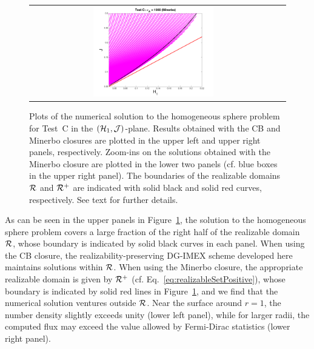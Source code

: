 \begin{figure}[h]
\begin{tabular}{cc}
    \includegraphics[width=0.5\textwidth]{figures/HomogeneousSphere_Realizability_Chi_1e3_Minerbo_Box2}
  \end{tabular}
   \caption{Plots of the numerical solution to the homogeneous sphere problem for Test~C in the $(\mathcal{H}_{1},\mathcal{J})$-plane.  Results obtained with the CB and Minerbo closures are plotted in the upper left and upper right panels, respectively.  Zoom-ins on the solutions obtained with the Minerbo closure are plotted in the lower two panels (cf. blue boxes in the upper right panel).  The boundaries of the realizable domains $\mathcal{R}$ and $\mathcal{R}^{+}$ are indicated with solid black and solid red curves, respectively.  See text for further details.  }
  \label{fig:HomogeneousSphereRealizability}
\end{figure}
As can be seen in the upper panels in Figure~\ref{fig:HomogeneousSphereRealizability}, the solution to the homogeneous sphere problem covers a large fraction of the right half of the realizable domain $\mathcal{R}$, whose boundary is indicated by solid black curves in each panel.  
When using the CB closure, the realizability-preserving DG-IMEX scheme developed here maintains solutions within $\mathcal{R}$.  
When using the Minerbo closure, the appropriate realizable domain is given by $\mathcal{R}^{+}$ (cf. Eq.~\eqref{eq:realizableSetPositive}), whose boundary is indicated by solid red lines in Figure~\ref{fig:HomogeneousSphereRealizability}, and we find that the numerical solution ventures outside $\mathcal{R}$.  
Near the surface around $r=1$, the number density slightly exceeds unity (lower left panel), while for larger radii, the computed flux may exceed the value allowed by Fermi-Dirac statistics (lower right panel).  